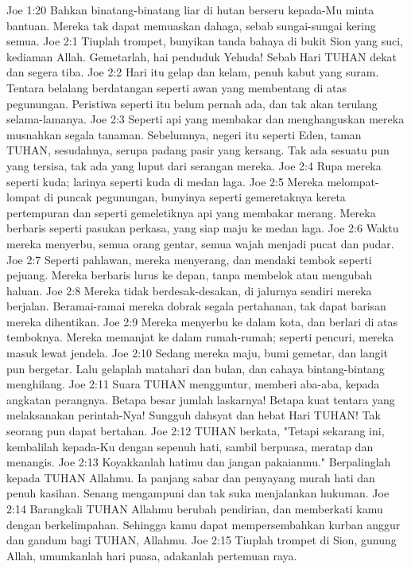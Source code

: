 Joe 1:20  Bahkan binatang-binatang liar di hutan berseru kepada-Mu minta bantuan. Mereka tak dapat memuaskan dahaga, sebab sungai-sungai kering semua.
Joe 2:1  Tiuplah trompet, bunyikan tanda bahaya di bukit Sion yang suci, kediaman Allah. Gemetarlah, hai penduduk Yehuda! Sebab Hari TUHAN dekat dan segera tiba.
Joe 2:2  Hari itu gelap dan kelam, penuh kabut yang suram. Tentara belalang berdatangan seperti awan yang membentang di atas pegunungan. Peristiwa seperti itu belum pernah ada, dan tak akan terulang selama-lamanya.
Joe 2:3  Seperti api yang membakar dan menghanguskan mereka musnahkan segala tanaman. Sebelumnya, negeri itu seperti Eden, taman TUHAN, sesudahnya, serupa padang pasir yang kersang. Tak ada sesuatu pun yang tersisa, tak ada yang luput dari serangan mereka.
Joe 2:4  Rupa mereka seperti kuda; larinya seperti kuda di medan laga.
Joe 2:5  Mereka melompat-lompat di puncak pegunungan, bunyinya seperti gemeretaknya kereta pertempuran dan seperti gemeletiknya api yang membakar merang. Mereka berbaris seperti pasukan perkasa, yang siap maju ke medan laga.
Joe 2:6  Waktu mereka menyerbu, semua orang gentar, semua wajah menjadi pucat dan pudar.
Joe 2:7  Seperti pahlawan, mereka menyerang, dan mendaki tembok seperti pejuang. Mereka berbaris lurus ke depan, tanpa membelok atau mengubah haluan.
Joe 2:8  Mereka tidak berdesak-desakan, di jalurnya sendiri mereka berjalan. Beramai-ramai mereka dobrak segala pertahanan, tak dapat barisan mereka dihentikan.
Joe 2:9  Mereka menyerbu ke dalam kota, dan berlari di atas temboknya. Mereka memanjat ke dalam rumah-rumah; seperti pencuri, mereka masuk lewat jendela.
Joe 2:10  Sedang mereka maju, bumi gemetar, dan langit pun bergetar. Lalu gelaplah matahari dan bulan, dan cahaya bintang-bintang menghilang.
Joe 2:11  Suara TUHAN mengguntur, memberi aba-aba, kepada angkatan perangnya. Betapa besar jumlah laskarnya! Betapa kuat tentara yang melaksanakan perintah-Nya! Sungguh dahsyat dan hebat Hari TUHAN! Tak seorang pun dapat bertahan.
Joe 2:12  TUHAN berkata, "Tetapi sekarang ini, kembalilah kepada-Ku dengan sepenuh hati, sambil berpuasa, meratap dan menangis.
Joe 2:13  Koyakkanlah hatimu dan jangan pakaianmu." Berpalinglah kepada TUHAN Allahmu. Ia panjang sabar dan penyayang murah hati dan penuh kasihan. Senang mengampuni dan tak suka menjalankan hukuman.
Joe 2:14  Barangkali TUHAN Allahmu berubah pendirian, dan memberkati kamu dengan berkelimpahan. Sehingga kamu dapat mempersembahkan kurban anggur dan gandum bagi TUHAN, Allahmu.
Joe 2:15  Tiuplah trompet di Sion, gunung Allah, umumkanlah hari puasa, adakanlah pertemuan raya.
